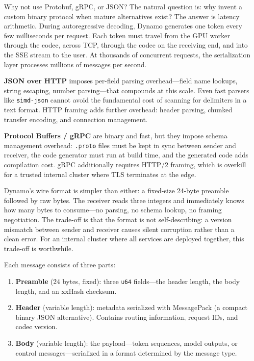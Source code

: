 \begin{whynotbox}{{Why not use Protobuf, gRPC, or JSON?}}
The natural question is: why invent a custom binary protocol when mature alternatives exist? The answer is latency arithmetic. During autoregressive decoding, Dynamo generates one token every few milliseconds per request. Each token must travel from the GPU worker through the codec, across TCP, through the codec on the receiving end, and into the SSE stream to the user. At thousands of concurrent requests, the serialization layer processes millions of messages per second.

\textbf{JSON over HTTP} imposes per-field parsing overhead---field name lookups, string escaping, number parsing---that compounds at this scale. Even fast parsers like \texttt{simd-json} cannot avoid the fundamental cost of scanning for delimiters in a text format. HTTP framing adds further overhead: header parsing, chunked transfer encoding, and connection management.

\textbf{Protocol Buffers / gRPC} are binary and fast, but they impose schema management overhead: \texttt{.proto} files must be kept in sync between sender and receiver, the code generator must run at build time, and the generated code adds compilation cost. gRPC additionally requires HTTP/2 framing, which is overkill for a trusted internal cluster where TLS terminates at the edge.

Dynamo's wire format is simpler than either: a fixed-size 24-byte preamble followed by raw bytes. The receiver reads three integers and immediately knows how many bytes to consume---no parsing, no schema lookup, no framing negotiation. The trade-off is that the format is not self-describing: a version mismatch between sender and receiver causes silent corruption rather than a clean error. For an internal cluster where all services are deployed together, this trade-off is worthwhile.
\end{whynotbox}

Each message consists of three parts:

\begin{enumerate}
  \item \textbf{Preamble} (24 bytes, fixed): three \texttt{u64} fields---the header length, the body length, and an xxHash checksum.
  \item \textbf{Header} (variable length): metadata serialized with MessagePack (a compact binary JSON alternative). Contains routing information, request IDs, and codec version.
  \item \textbf{Body} (variable length): the payload---token sequences, model outputs, or control messages---serialized in a format determined by the message type.
\end{enumerate}

